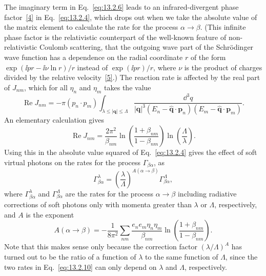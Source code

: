 The imaginary term in Eq.~\eqref{eq:13.2.6} leads to an infrared-divergent phase
factor~\hyperref[ref:13.4]{[4]} in Eq.~\eqref{eq:13.2.4}, which drops out when we take the absolute value of
the matrix element to calculate the rate for the process $\alpha\to\beta$. (This infinite
phase factor is the relativistic counterpart of the well-known feature of
non-relativistic Coulomb scattering, that the outgoing wave part of the
Schrödinger wave function has a dependence on the radial coordinate $r$ of
the form $\exp(\ii pr-\ii\nu\ln r)/r$ instead of $\exp(\ii pr)/r$, where $\nu$ is the product
of charges divided by the relative velocity~\hyperref[ref:13.5]{[5]}.) The reaction rate is affected
by the real part of $J_{nm}$, which for all $\eta_n$ and $\eta_m$ takes the value
\begin{equation}
  \operatorname{Re}J_{nm}=-\pi(p_n\cdot p_m)
  \int_{\lambda\leq|\mathbf q|\leq\Lambda}
  \frac{\dd^3q}{|\mathbf q|^3
  (E_n-\hat{\mathbf q}\cdot\mathbf p_n)(E_m-\hat{\mathbf q}\cdot\mathbf p_m)}.
  \tag{13.2.8}\label{eq:13.2.8}
\end{equation}
An elementary calculation gives
\begin{equation}
  \operatorname{Re}J_{nm}=\frac{2\pi^2}{\beta_{nm}}
  \ln\left(\frac{1+\beta_{nm}}{1-\beta_{nm}}\right)
  \ln\left(\frac{\Lambda}{\lambda}\right).
  \tag{13.2.9}\label{eq:13.2.9}
\end{equation}
Using this in the absolute value squared of Eq.~\eqref{eq:13.2.4} gives the effect of
soft virtual photons on the rates for the process $\Gamma_{\beta\alpha}$, as
\begin{equation}
  \Gamma^\lambda_{\beta\alpha}=\left(\frac{\lambda}{\Lambda}\right)^{A(\alpha\to\beta)}
  \Gamma^\Lambda_{\beta\alpha},
  \tag{13.2.10}\label{eq:13.2.10}
\end{equation}
where $\Gamma^\lambda_{\beta\alpha}$ and $\Gamma^\Lambda_{\beta\alpha}$ are the rates for the process $\alpha\to\beta$ including radiative
corrections of soft photons only with momenta greater than $\lambda$ or $\Lambda$,
respectively, and $A$ is the exponent
\begin{equation}
  A(\alpha\to\beta)=-\frac{1}{8\pi^2}\sum_{nm}
  \frac{e_n e_m\eta_n\eta_m}{\beta_{nm}}
  \ln\left(\frac{1+\beta_{nm}}{1-\beta_{nm}}\right).
  \tag{13.2.11}\label{eq:13.2.11}
\end{equation}
Note that this makes sense only because the correction factor $(\lambda/\Lambda)^A$
has turned out to be the ratio of a function of $\lambda$ to the same function
of $\Lambda$, since the two rates in Eq.~\eqref{eq:13.2.10} can only depend on $\lambda$ and $\Lambda$,
respectively.


